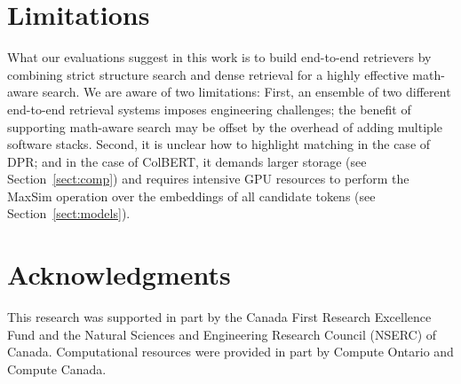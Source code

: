 \documentclass[11pt]{article}
\begin{document}
\section{Limitations}
What our evaluations suggest in this work is to build end-to-end retrievers by combining strict structure search and dense retrieval for a highly effective math-aware search.
We are aware of two limitations:
First, an ensemble of two different end-to-end retrieval systems imposes engineering challenges; the benefit of supporting math-aware search may be offset by the overhead of adding multiple software stacks.
Second, it is unclear how to highlight matching in the case of DPR;
and in the case of ColBERT, it demands larger storage (see Section~\ref{sect:comp}) and requires intensive GPU resources to perform the MaxSim operation over the embeddings of all candidate tokens (see Section~\ref{sect:models}).

\section*{Acknowledgments}
This research was supported in part by the Canada First Research Excellence Fund and the Natural Sciences and Engineering Research Council (NSERC) of Canada.
Computational resources were provided in part by Compute Ontario and Compute Canada.



\end{document}

